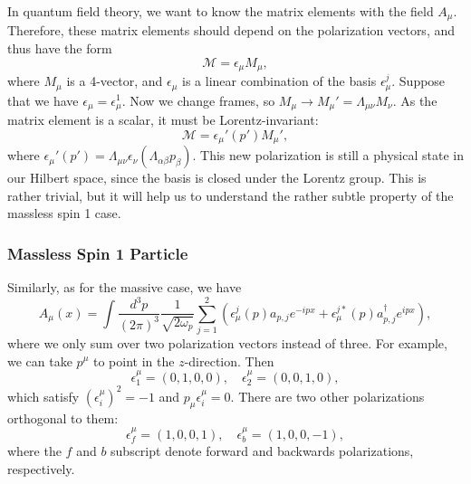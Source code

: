 \documentclass[11pt]{article}
\theoremstyle{definition}
\begin{document}
In quantum field theory, we want to know the matrix elements with the field $A_\mu$. Therefore, these matrix elements should depend on the polarization vectors, and thus have the form
\begin{equation}
    \mathcal{M} = \epsilon_\mu M_\mu,
\end{equation}
where $M_\mu$ is a 4-vector, and $\epsilon_\mu$ is a linear combination of the basis $\epsilon_\mu^j$. Suppose that we have $\epsilon_\mu = \epsilon_\mu^1$. Now we change frames, so $M_\mu \rightarrow M_\mu' = \Lambda_{\mu\nu}M_\nu$. As the matrix element is a scalar, it must be Lorentz-invariant:
\begin{equation}
    \mathcal{M} = \epsilon_\mu'(p')M_\mu',
\end{equation}
where $\epsilon_\mu'(p') = \Lambda_{\mu\nu}\epsilon_\nu(\Lambda_{\alpha\beta}p_\beta)$. This new polarization is still a physical state in our Hilbert space, since the basis is closed under the Lorentz group. This is rather trivial, but it will help us to understand the rather subtle property of the massless spin 1 case.

\subsubsection{Massless Spin 1 Particle}
Similarly, as for the massive case, we have
\begin{equation}
    A_\mu(x) = \int\frac{d^3p}{(2\pi)^3}\frac{1}{\sqrt{2\omega_p}}\sum_{j=1}^2(\epsilon_\mu^j(p)a_{p,j}e^{-ipx} + \epsilon_\mu^{j*}(p)a_{p,j}^\dagger e^{ipx}),
\end{equation}
where we only sum over two polarization vectors instead of three. For example, we can take $p^\mu$ to point in the $z$-direction. Then
\begin{equation}
    \epsilon^\mu_1 = (0,1,0,0), \quad \epsilon^\mu_2 = (0,0,1,0),
\end{equation}
which satisfy $(\epsilon^\mu_i)^2 = -1$ and $p_\mu \epsilon^\mu_i = 0$. There are two other polarizations orthogonal to them:
\begin{equation}
    \epsilon^\mu_f = (1, 0,0,1), \quad \epsilon^\mu_b = (1, 0,0,-1),
\end{equation}
where the $f$ and $b$ subscript denote forward and backwards polarizations, respectively.
\end{document}
